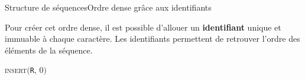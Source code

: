 \begin{frame}{Structure de séquences}{Ordre dense grâce aux identifiants}

  Pour créer cet ordre dense, il est possible d'allouer un \textbf{identifiant}
  unique et immuable à chaque caractère. Les
  identifiants permettent de retrouver l'ordre des éléments de la séquence.
  
  \vspace{1cm}
  
  \textsc{insert}$($\texttt{R}, $0)$   \\

  \vspace{1cm}

  \begin{center}
    
  \end{center}

\end{frame}



  
  

